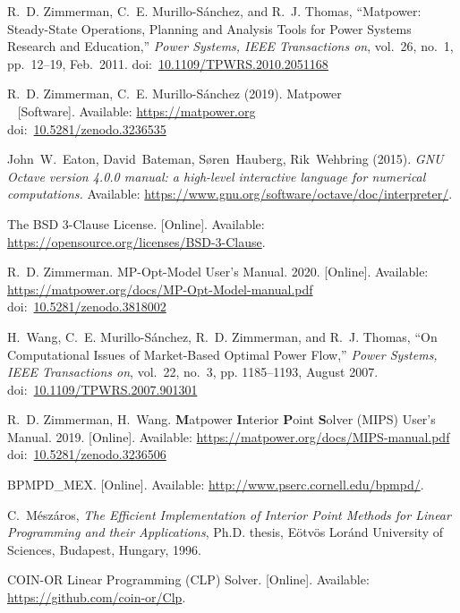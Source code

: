 \documentclass[12pt]{article}
\newcommand{\matpower}[0]{{\sc Matpower}}
\newcommand{\mips}[0]{{MIPS}}
\newcommand{\mipsname}[0]{{{\bf M}{\sc atpower} \textbf{I}nterior \textbf{P}oint \textbf{S}olver}}
\newcommand{\mpom}[0]{\mbox{MP-Opt-Model}}
\newcommand{\mpomname}[0]{\mpom{}}
\newcommand{\doi}[1]{doi:~\href{https://doi.org/#1}{#1}}
\numberwithin{equation}{section}
\numberwithin{table}{section}
\numberwithin{figure}{section}
\begin{document}
\clearpage
\begin{thebibliography}{99}
R.~D. Zimmerman, C.~E. Murillo-S{\'a}nchez, and R.~J. Thomas, ``\matpower{}: Steady-State Operations, Planning and Analysis Tools for Power Systems Research and Education,'' \emph{Power Systems, IEEE Transactions on}, vol.~26, no.~1, pp.~12--19, Feb.~2011.
\doi{10.1109/TPWRS.2010.2051168}

R.~D. Zimmerman, C.~E. Murillo-S{\'a}nchez (2019). \matpower{}\\~
[Software]. Available: \url{https://matpower.org}\\
\doi{10.5281/zenodo.3236535}

John~W.~Eaton, David~Bateman, S{\o}ren~Hauberg, Rik~Wehbring (2015). \emph{GNU Octave version 4.0.0 manual: a high-level interactive language for numerical computations.} Available: \url{https://www.gnu.org/software/octave/doc/interpreter/}.

The BSD 3-Clause License. [Online]. Available: \url{https://opensource.org/licenses/BSD-3-Clause}.

R.~D. Zimmerman. \mpomname{} User's Manual. 2020.
[Online]. Available: \url{https://matpower.org/docs/MP-Opt-Model-manual.pdf}\\
\doi{10.5281/zenodo.3818002}

H.~Wang, C.~E. Murillo-S{\'a}nchez, R.~D. Zimmerman, and R.~J. Thomas, ``On
Computational Issues of Market-Based Optimal Power Flow,'' \emph{Power
Systems, IEEE Transactions on}, vol.~22, no.~3, pp. 1185--1193, August 2007.
\doi{10.1109/TPWRS.2007.901301}

R.~D. Zimmerman, H.~Wang. \mipsname{} (\mips{}) User's Manual. 2019.
[Online]. Available: \url{https://matpower.org/docs/MIPS-manual.pdf}\\
\doi{10.5281/zenodo.3236506}

BPMPD\_MEX. [Online]. Available:
  \url{http://www.pserc.cornell.edu/bpmpd/}.

C.~M{\'e}sz{\'a}ros, \emph{The Efficient Implementation of Interior Point Methods for Linear Programming and their Applications}, Ph.D. thesis,
  E{\"o}tv{\"o}s Lor{\'a}nd University of Sciences, Budapest, Hungary, 1996.

COIN-OR Linear Programming (CLP) Solver. [Online]. Available:
  \url{https://github.com/coin-or/Clp}.


\end{thebibliography}
\end{document}
